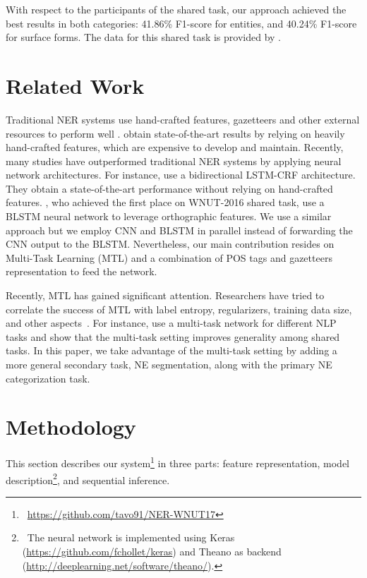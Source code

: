 \documentclass[11pt,letterpaper]{article}
\begin{document}
With respect to the participants of the shared task, our approach achieved the best results in both categories: 41.86\% F1-score for entities, and 40.24\% F1-score for surface forms. The data for this shared task is provided by \citet{wnutOrganizers17}.

\section{Related Work}

Traditional NER systems use hand-crafted features, gazetteers and other external resources to perform well \cite{Ratinov:2009:DCM:1596374.1596399}. \citet{luo-EtAl:2015:EMNLP2} obtain state-of-the-art results by relying on heavily hand-crafted features, which are expensive to develop and maintain. Recently, many studies have outperformed traditional NER systems by applying neural network architectures. For instance, \citet{glample2016} use a bidirectional LSTM-CRF architecture. They obtain a state-of-the-art performance without relying on hand-crafted features. \citet{limsopatham2016_wnut_ner}, who achieved the first place on WNUT-2016 shared task, use a BLSTM neural network to leverage orthographic features. We use a similar approach but we employ CNN and BLSTM in parallel instead of forwarding the CNN output to the BLSTM. Nevertheless, our main contribution resides on Multi-Task Learning (MTL) and a combination of POS tags and gazetteers representation to feed the network.
    
    Recently, MTL has gained significant attention. Researchers have tried to correlate the success of MTL with label entropy, regularizers, training data size, and other aspects~\cite{martinezalonso-plank:2017:EACLlong,bingel-sogaard:2017:EACLshort}. For instance,  use a multi-task network for different NLP tasks and show that the multi-task setting improves generality among shared tasks. In this paper, we take advantage of the multi-task setting by adding a more general secondary task, NE segmentation, along with the primary NE categorization task.

\section{Methodology}

This section describes our system\footnote{~\url{https://github.com/tavo91/NER-WNUT17}}
in three parts: feature representation, model description\footnote{~The neural network is implemented using Keras (\url{https://github.com/fchollet/keras}) and Theano as backend (\url{http://deeplearning.net/software/theano/}).}, and sequential inference. 
\end{document}
